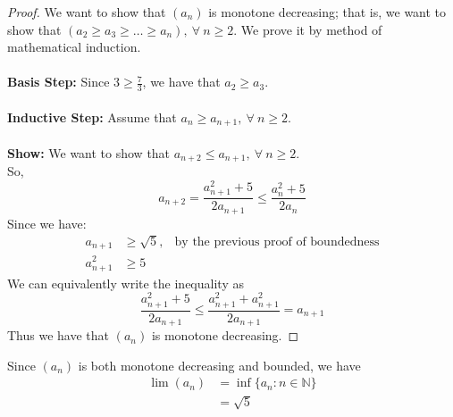 \documentclass[12pt,letterpaper]{article}
\newcommand{\N}{\mathbb{N}}
\theoremstyle{case}
\theoremstyle{definition}
\begin{document}
\begin{enumerate}
\begin{enumerate}
\begin{proof}
			We want to show that $(a_n)$ is monotone decreasing; that is, we want to show that $(a_2 \geq a_3 \geq \dots \geq a_n),\ \forall\ n \geq 2$. We prove it by method of mathematical induction.
			\\\\\textbf{Basis Step:} Since $3 \geq \frac{7}{3}$, we have that $a_2 \geq a_3$.
			\\\\\textbf{Inductive Step:} Assume that $a_n \geq a_{n+1},\ \forall\ n \geq 2$.
			\\\\\textbf{Show:} We want to show that $a_{n+2} \leq a_{n+1},\ \forall\ n \geq 2$.
			\\So,
			\[a_{n+2} = \frac{a_{n+1}^2+5}{2a_{n+1}} \leq \frac{a_n^2+5}{2a_n}\]
			Since we have:
			\begin{align*}
				a_{n+1} &\geq \sqrt{5}, &\text{by the previous proof of boundedness} \\
				a_{n+1}^2 &\geq 5
			\end{align*}
			We can equivalently write the inequality as
			\[\frac{a_{n+1}^2+5}{2a_{n+1}} \leq \frac{a_{n+1}^2+a_{n+1}^2}{2a_{n+1}}=a_{n+1}\]
			Thus we have that $(a_n)$ is monotone decreasing.
		\end{proof}
		Since $(a_n)$ is both monotone decreasing and bounded, we have
		\begin{align*}
			\lim (a_n) &= \inf \{a_n:n \in \N\} \\
			&= \sqrt{5}
		\end{align*} 
		

\end{enumerate}
\end{enumerate}
\end{document}

